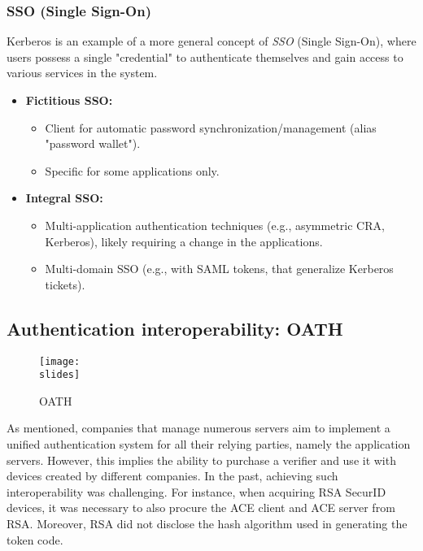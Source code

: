 \subsubsection*{SSO (Single Sign-On)}

Kerberos is an example of a more general concept of \textit{SSO} (Single Sign-On), where users possess a single "credential" to authenticate themselves and gain access to various services in the system.

\begin{itemize}
  \item \textbf{Fictitious SSO:}
        \begin{itemize}
          \item Client for automatic password synchronization/management (alias "password wallet").
          \item Specific for some applications only.
        \end{itemize}

  \item \textbf{Integral SSO:}
        \begin{itemize}
          \item Multi-application authentication techniques (e.g., asymmetric CRA, Kerberos), likely requiring a change in the applications.
          \item Multi-domain SSO (e.g., with SAML tokens, that generalize Kerberos tickets).
        \end{itemize}
\end{itemize}



\subsection{Authentication interoperability: OATH}

\begin{figure}[h]
  \centering
  \texttt{[image: \\slides]}
  \caption{OATH}
\end{figure}

As mentioned, companies that manage numerous servers aim to implement a unified authentication system for all their relying parties, namely the application servers. However, this implies the ability to purchase a verifier and use it with devices created by different companies. In the past, achieving such interoperability was challenging. For instance, when acquiring RSA SecurID devices, it was necessary to also procure the ACE client and ACE server from RSA. Moreover, RSA did not disclose the hash algorithm used in generating the token code.

